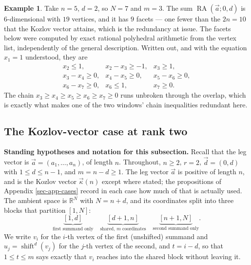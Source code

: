 \documentclass[11pt, a4paper, abstract=yes]{scrartcl}
\theoremstyle{definition}
\newtheorem{mexample}[definition]{Example}
\theoremstyle{remark}
\theoremstyle{plain}
\newcommand{\shift}{\operatorname{shift}}
\newcommand{\RA}{\operatorname{RA}}
\newcommand{\kozvec}{\vec\kappa}
\begin{document}
\begin{mexample}
Take \(n=5\), \(d=2\), so \(N=7\) and \(m=3\). The sum \(\RA(\vec a;0,d)\) is \(6\)-dimensional
with \(19\)
vertices, and it has \(9\) facets --- one fewer than the \(2n=10\) that the Kozlov vector attains,
which is the redundancy at issue. The facets below were computed
by exact rational polyhedral arithmetic from the vertex list, independently of the general
description. Written out,
and with the equation \(x_1=1\) understood, they are
\[
\begin{array}{lll}
 x_2\le 1, & x_2-x_3\ge-1, & x_3\ge 1,\\
 x_3-x_4\ge 0, & x_4-x_5\ge 0, & x_5-x_6\ge 0,\\
 x_6-x_7\ge 0, & x_6\le 1, & x_7\ge 0 .
\end{array}
\]
The chain \(x_3\ge x_4\ge x_5\ge x_6\ge x_7\ge0\) runs unbroken through the overlap, which is
exactly what makes one of the two windows' chain inequalities redundant here.
\label{ex-ones-facets}
\end{mexample}
\subsection{The Kozlov-vector case at rank two}
\label{sec:orgc373e84}

\textbf{Standing hypotheses and notation for this subsection.} Recall that the leg vector is
\(\vec a=(a_1,\dots,a_n)\), of length \(n\). Throughout, \(n\ge2\), \(r=2\),
\(\vec d=(0,d)\) with \(1\le d\le n-1\), and \(m=n-d\ge1\). The leg vector \(\vec a\) is positive of
length \(n\), and is the Kozlov vector \(\kozvec(n)\) except where stated; the propositions of
Appendix \ref{sec-app-cases} record in each case how much of that is actually used. The
ambient space is \(\mathbb R^N\) with \(N=n+d\), and its coordinates split into three blocks that
partition \([1,N]\):
\begin{equation}\label{eq:ones-facets}
  \underbrace{[1,d]}_{\text{first summand only}}\quad
  \underbrace{[d+1,n]}_{\text{shared, }m\text{ coordinates}}\quad
  \underbrace{[n+1,N]}_{\text{second summand only}} .
\end{equation}
We write \(v_i\) for the \(i\)-th vertex of the first (unshifted) summand and
\(u_j=\shift^d(v_j)\) for the \(j\)-th vertex of the second, and \(t=i-d\), so that
\(1\le t\le m\) says exactly that \(v_i\) reaches into the shared block without leaving it.
\end{document}
